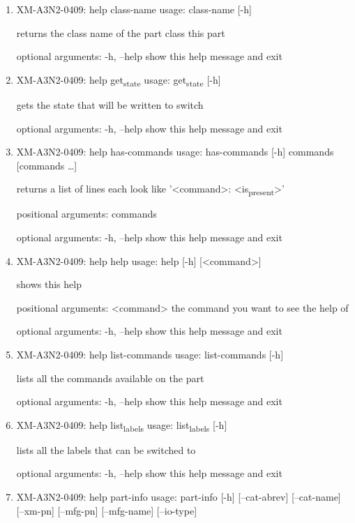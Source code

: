 \documentclass[11pt]{article}
\begin{document}
\begin{enumerate}
\item XM-A3N2-0409: help class-name
\label{sec:orgf8dc2e6}
usage: class-name [-h]

returns the class name of the part class this part

optional arguments:
  -h, --help  show this help message and exit

\item XM-A3N2-0409: help get\textsubscript{state}
\label{sec:orgb067e49}
usage: get\textsubscript{state} [-h]

gets the state that will be written to switch

optional arguments:
  -h, --help  show this help message and exit

\item XM-A3N2-0409: help has-commands
\label{sec:orge4b606f}
usage: has-commands [-h] commands [commands \ldots{}]

returns a list of lines each look like '<command>: <is\textsubscript{present}>'

positional arguments:
  commands

optional arguments:
  -h, --help  show this help message and exit

\item XM-A3N2-0409: help help
\label{sec:org7f2dd2a}
usage: help [-h] [<command>]

shows this help

positional arguments:
  <command>   the command you want to see the help of

optional arguments:
  -h, --help  show this help message and exit

\item XM-A3N2-0409: help list-commands
\label{sec:org0f1dc3e}
usage: list-commands [-h]

lists all the commands available on the part

optional arguments:
  -h, --help  show this help message and exit

\item XM-A3N2-0409: help list\textsubscript{labels}
\label{sec:org4e7aefd}
usage: list\textsubscript{labels} [-h]

lists all the labels that can be switched to

optional arguments:
  -h, --help  show this help message and exit

\item XM-A3N2-0409: help part-info
\label{sec:orga6829b6}
usage: part-info  [-h] [--cat-abrev] [--cat-name] [--xm-pn] [--mfg-pn] [--mfg-name]
        [--io-type]


\end{enumerate}
\end{document}
